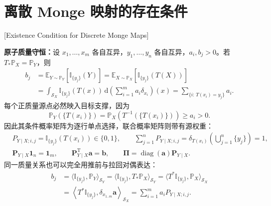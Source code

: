 \chapter{离散 Monge 映射的存在条件}[Existence Condition for Discrete Monge Maps]\label{cw:app:monge}

\textbf{原子质量守恒：}设 $x_1,\dots,x_m$ 各自互异，$y_1,\dots,y_n$ 各自互异，$a_i,b_j>0$。若 $T_*\mathbb P_X=\mathbb P_Y$，则
\begin{equation}\label{cw:eq:monge-atom-mass}
\begin{aligned}
b_j&=\mathbb E_{Y\sim\mathbb P_Y}[\mathbb I_{\{y_j\}}(Y)]
=\mathbb E_{X\sim\mathbb P_X}[\mathbb I_{\{y_j\}}(T(X))]\\
&=\int_{\mathcal S_X}\mathbb I_{\{y_j\}}(T(x))\,
\mathrm d\!\left(\sum_{i=1}^m a_i\delta_{x_i}\right)(x)
=\sum_{\{i:\,T(x_i)=y_j\}}a_i.
\end{aligned}
\end{equation}
每个正质量源点必然映入目标支撑，因为
\begin{equation}\label{cw:eq:monge-support}
\mathbb P_Y(\{T(x_i)\})
=\mathbb P_X(T^{-1}(\{T(x_i)\}))\ge a_i>0.
\end{equation}
因此其条件概率矩阵为逐行单点选择，联合概率矩阵则带有源权重：
\begin{equation}\label{cw:eq:monge-conditional}
\begin{aligned}
&P_{Y\mid X;i,j}=\mathbb I_{\{y_j\}}(T(x_i))\in\{0,1\},\qquad
\sum_{j=1}^n P_{Y\mid X;i,j}
=\delta_{T(x_i)}\!\left(\bigcup_{j=1}^n\{y_j\}\right)=1,\\
&\bm P_{Y\mid X}\mathbf1_n=\mathbf1_m,\qquad
\bm P_{Y\mid X}^{\mathrm T}\bm a=\bm b,\qquad
\bm\Pi=\operatorname{diag}(\bm a)\bm P_{Y\mid X}.
\end{aligned}
\end{equation}
同一质量关系也可以完全用推前与拉回对偶表达：
\begin{equation}\label{cw:eq:monge-duality}
\begin{aligned}
b_j&=\langle\mathbb I_{\{y_j\}},\mathbb P_Y\rangle_{\mathcal S_Y}
=\langle\mathbb I_{\{y_j\}},T_*\mathbb P_X\rangle_{\mathcal S_Y}
=\langle T^*\mathbb I_{\{y_j\}},\mathbb P_X\rangle_{\mathcal S_X}\\
&=\left\langle T^*\mathbb I_{\{y_j\}},
\delta_{x_{1..m}}\bm a\right\rangle_{\mathcal S_X}
=\sum_{i=1}^m a_iP_{Y\mid X;i,j}.
\end{aligned}
\end{equation}

